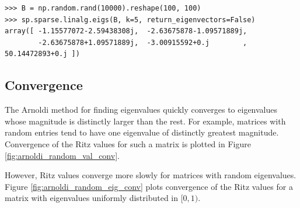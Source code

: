 \begin{lstlisting}
>>> B = np.random.rand(10000).reshape(100, 100)
>>> sp.sparse.linalg.eigs(B, k=5, return_eigenvectors=False)
array([ -1.15577072-2.59438308j,  -2.63675878-1.09571889j,
        -2.63675878+1.09571889j,  -3.00915592+0.j        ,  50.14472893+0.j ])
\end{lstlisting}


\subsection*{Convergence}
The Arnoldi method for finding eigenvalues quickly converges to eigenvalues whose magnitude is distinctly larger than the rest.
For example, matrices with random entries tend to have one eigenvalue of distinctly greatest magnitude. 
Convergence of the Ritz values for such a matrix is plotted in Figure \ref{fig:arnoldi_random_val_conv}.

However, Ritz values converge more slowly for matrices with random eigenvalues. 
Figure \ref{fig:arnoldi_random_eig_conv} plots convergence of the Ritz values for a matrix with eigenvalues uniformly distributed in $[0,1)$.



